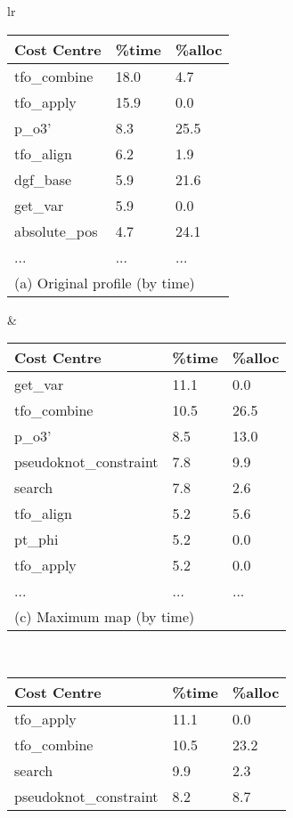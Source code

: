 \begin{table}
\begin{center}
\begin{tabular}{lr}
\begin{tabular}{|l|l|l|}
\hline
{\bf Cost Centre} &  \%time      & \%alloc \\
\hline
tfo\_combine      &       18.0   & 4.7 \\
tfo\_apply        &       15.9   & 0.0 \\
p\_o3'            &       8.3    & 25.5 \\
tfo\_align        &       6.2    & 1.9 \\
dgf\_base         &       5.9    & 21.6 \\
get\_var          &       5.9    & 0.0 \\
absolute\_pos     &       4.7    & 24.1 \\
...               &       ...    & ... \\
\hline
\multicolumn{3}{l}{(a) Original profile (by time)}
\end{tabular}
&
\begin{tabular}{|l|l|l|}
\hline
{\bf Cost Centre} &  \%time     & \%alloc \\
\hline
get\_var          &   11.1      &    0.0 \\
tfo\_combine      &   10.5      &   26.5 \\
p\_o3'            &    8.5      &   13.0 \\
pseudoknot\_constraint &    7.8 &    9.9 \\
search            &    7.8      &    2.6 \\
tfo\_align        &    5.2      &    5.6 \\
pt\_phi           &    5.2      &    0.0 \\
tfo\_apply        &    5.2      &    0.0 \\
...               &      ...    & ... \\
\hline
\multicolumn{3}{l}{(c) Maximum map (by time)}
\end{tabular}
\\
\begin{tabular}{|l|l|l|}
\hline
{\bf Cost Centre} &  \%time     & \%alloc \\
\hline
tfo\_apply        &   11.1      &    0.0 \\
tfo\_combine      &   10.5      &   23.2 \\
search            &    9.9      &    2.3 \\
pseudoknot\_constraint &    8.2 &    8.7 \\

\end{tabular}
\end{tabular}
\end{center}
\end{table}
